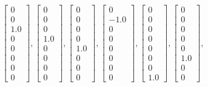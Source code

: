 \documentclass{scrartcl}
\begin{document}
\begin{equation*}
	\left[\begin{matrix}0\\0\\1.0\\0\\0\\0\\0\\0\end{matrix}\right],
	\left[\begin{matrix}0\\0\\0\\1.0\\0\\0\\0\\0\end{matrix}\right],
	\left[\begin{matrix}0\\0\\0\\0\\1.0\\0\\0\\0\end{matrix}\right],
	\left[\begin{matrix}0\\-1.0\\0\\0\\0\\0\\0\\0\end{matrix}\right],
	\left[\begin{matrix}0\\0\\0\\0\\0\\0\\0\\1.0\end{matrix}\right],
	\left[\begin{matrix}0\\0\\0\\0\\0\\1.0\\0\\0\end{matrix}\right],

\end{equation*}
\end{document}
